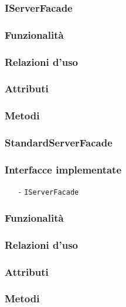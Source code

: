 \subsubsection{IServerFacade}\label{sec:iserverfacade}

\subsubsection*{Funzionalità}

\subsubsection*{Relazioni d'uso}

\subsubsection*{Attributi}

\subsubsection*{Metodi}

\subsubsection{StandardServerFacade}\label{sec:standardserverfacade}

\subsubsection*{Interfacce implementate}
\begin{itemize}[noitemsep,nolistsep]
  \item[-] \texttt{IServerFacade}
\end{itemize}

\subsubsection*{Funzionalità}

\subsubsection*{Relazioni d'uso}

\subsubsection*{Attributi}

\subsubsection*{Metodi}

